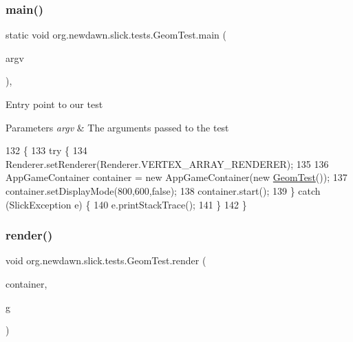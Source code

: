 \subsubsection{\texorpdfstring{main()}{main()}}
{\footnotesize\ttfamily static void org.\+newdawn.\+slick.\+tests.\+Geom\+Test.\+main (\begin{DoxyParamCaption}\item[{String \mbox{[}$\,$\mbox{]}}]{argv }\end{DoxyParamCaption})\hspace{0.3cm}{\ttfamily [inline]}, {\ttfamily [static]}}

Entry point to our test


\begin{DoxyParams}{Parameters}
{\em argv} & The arguments passed to the test \\
\hline
\end{DoxyParams}

\begin{DoxyCode}
132                                            \{
133         \textcolor{keywordflow}{try} \{
134             Renderer.setRenderer(Renderer.VERTEX\_ARRAY\_RENDERER);
135             
136             AppGameContainer container = \textcolor{keyword}{new} AppGameContainer(\textcolor{keyword}{new} \mbox{\hyperlink{classorg_1_1newdawn_1_1slick_1_1tests_1_1_geom_test_a2f4f50a6ee99e1b6d3441b72bc1f1e40}{GeomTest}}());
137             container.setDisplayMode(800,600,\textcolor{keyword}{false});
138             container.start();
139         \} \textcolor{keywordflow}{catch} (SlickException e) \{
140             e.printStackTrace();
141         \}
142     \}
\end{DoxyCode}
\mbox{\label{classorg_1_1newdawn_1_1slick_1_1tests_1_1_geom_test_a41b6c864edf3f31e2f758ec80b8791bc}} 
\subsubsection{\texorpdfstring{render()}{render()}}
{\footnotesize\ttfamily void org.\+newdawn.\+slick.\+tests.\+Geom\+Test.\+render (\begin{DoxyParamCaption}\item[{\mbox{\hyperlink{classorg_1_1newdawn_1_1slick_1_1_game_container}{Game\+Container}}}]{container,  }\item[{\mbox{\hyperlink{classorg_1_1newdawn_1_1slick_1_1_graphics}{Graphics}}}]{g }\end{DoxyParamCaption})\hspace{0.3cm}{\ttfamily [inline]}}


